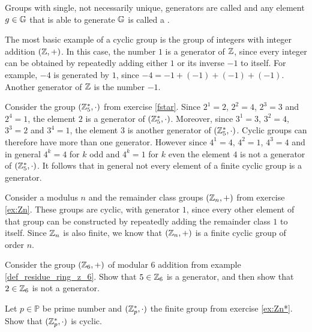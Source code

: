 \begin{definition}\label{cyclic-groups}
Groups with single, not necessarily unique, generators are called  and any element $g\in \mathbb{G}$ that is able to generate $\mathbb{G}$ is called a .
\end{definition}

\begin{example}
\label{example:cyclic_group_of_integers} The most basic example of a cyclic group is the group of integers with integer addition $(\mathbb{Z},+)$. In this case, the number $1$ is a generator of $\mathbb{Z}$, since every integer can be obtained by repeatedly adding either $1$ or its inverse $-1$ to itself. For example, $-4$ is generated by $1$, since $-4=-1+(-1)+(-1)+(-1)$. Another generator of $\mathbb{Z}$ is the number $-1$.
\end{example}
\begin{example}
\label{example:cyclic_group_F5*} Consider the group $(\mathbb{Z}_5^*,\cdot)$ from exercise \ref{fstar}. Since $2^1=2$, $2^2=4$, $2^3=3$ and $2^4=1$, the element $2$ is a generator of $(\mathbb{Z}_5^*,\cdot)$. Moreover, since $3^1=3$, $3^2=4$, $3^3=2$ and $3^4=1$, the element $3$ is another generator of $(\mathbb{Z}_5^*,\cdot)$. Cyclic groups can therefore have more than one generator. However since $4^1=4$, $4^2=1$, $4^3=4$ and in general $4^k=4$ for $k$ odd and $4^k=1$ for $k$ even the element $4$ is not a generator of $(\mathbb{Z}_5^*,\cdot)$. It follows that in general not every element of a finite cyclic group is a generator.
\end{example}
\begin{example} Consider a modulus $n$ and the remainder class groups $(\mathbb{Z}_n,+)$ from exercise \ref{ex:Zn}. These groups are cyclic, with generator $1$, since every other element of that group can be constructed by repeatedly adding the remainder class $1$ to itself. Since $\mathbb{Z}_n$ is also finite, we know that $(\mathbb{Z}_n,+)$ is a finite cyclic group of order $n$.
\end{example}
\begin{exercise}
\label{example:cyclic_group_F6}
Consider the group $(\mathbb{Z}_6,+)$ of modular 6 addition from example \ref{def_residue_ring_z_6}. Show that $5\in \mathbb{Z}_6$ is a generator, and then show that $2\in \mathbb{Z}_6$ is not a generator.
\end{exercise}
\begin{exercise}\label{ex:modulus-prime-group} Let $p\in\mathbb{P}$ be prime number and $(\mathbb{Z}_p^*,\cdot)$ the finite group from exercise \ref{ex:Zn*}. Show that $(\mathbb{Z}_p^*,\cdot)$ is cyclic.
\end{exercise}

